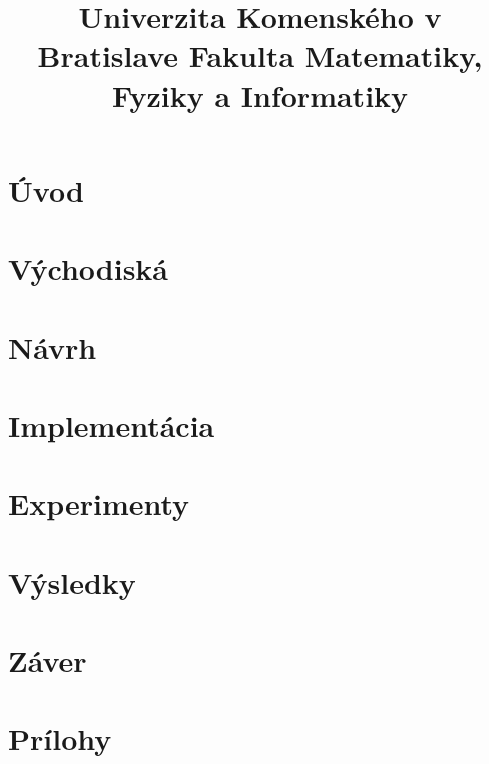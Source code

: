 \documentclass[12pt,a4paper]{bachelor}
\title{Univerzita Komenského v Bratislave Fakulta Matematiky, Fyziky a Informatiky}
\author{\autor}
\begin{document}



\tableofcontents
\newpage

\chapter*{Úvod}


\chapter{Východiská}


\chapter{Návrh}


\chapter{Implementácia}


\chapter{Experimenty}


\chapter{Výsledky}


\chapter*{Záver}


\printbibliography

\chapter*{Prílohy}


\label{totalpages}
\end{document}
